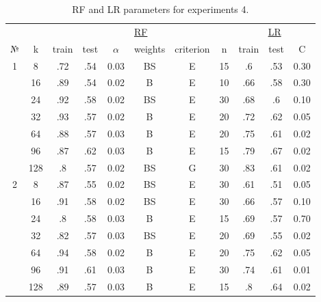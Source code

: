 \begin{table}
\centering
\caption{RF and LR parameters for experiments 4.}
\label{tab:params_4_rf_lr}
\begin{tabular}{|c|c|cccccc||ccc|}\hline
& & \multicolumn{6}{c||}{\underline{RF}} & \multicolumn{3}{c|}{\underline{LR}}\\
№ &   k & train & test & $\alpha$ & weights & criterion &  n & train & test &    C \\\hline
1 &   8 &   .72 &  .54 &     0.03 &      BS &         E & 15 &    .6 &  .53 & 0.30 \\
  &  16 &   .89 &  .54 &     0.02 &       B &         E & 10 &   .66 &  .58 & 0.30 \\
  &  24 &   .92 &  .58 &     0.02 &      BS &         E & 30 &   .68 &   .6 & 0.10 \\
  &  32 &   .93 &  .57 &     0.02 &       B &         E & 20 &   .72 &  .62 & 0.05 \\
  &  64 &   .88 &  .57 &     0.03 &       B &         E & 20 &   .75 &  .61 & 0.02 \\
  &  96 &   .87 &  .62 &     0.03 &       B &         E & 15 &   .79 &  .67 & 0.02 \\
  & 128 &    .8 &  .57 &     0.02 &      BS &         G & 30 &   .83 &  .61 & 0.02 \\\hline
2 &   8 &   .87 &  .55 &     0.02 &      BS &         E & 30 &   .61 &  .51 & 0.05 \\
  &  16 &   .91 &  .58 &     0.02 &      BS &         E & 30 &   .66 &  .57 & 0.10 \\
  &  24 &    .8 &  .58 &     0.03 &       B &         E & 15 &   .69 &  .57 & 0.70 \\
  &  32 &   .82 &  .57 &     0.03 &      BS &         E & 20 &   .69 &  .55 & 0.02 \\
  &  64 &   .94 &  .58 &     0.02 &       B &         E & 20 &   .75 &  .62 & 0.05 \\
  &  96 &   .91 &  .61 &     0.03 &       B &         E & 30 &   .74 &  .61 & 0.01 \\
  & 128 &   .89 &  .57 &     0.03 &       B &         E & 15 &    .8 &  .64 & 0.02 \\\hline
\end{tabular}
\end{table}
